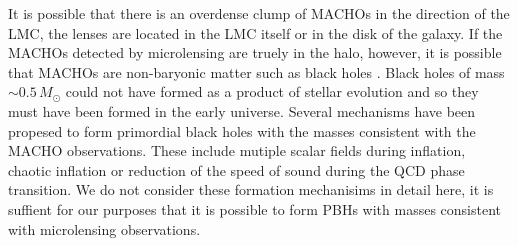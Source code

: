 It is possible that there is an overdense clump of MACHOs in the direction of
the LMC\cite{1996ApJ...473L..99N}, the lenses are located in the LMC
itself\cite{Salati:1999gd} or in the disk of the galaxy\cite{Evans:1997hq}. 
If the MACHOs detected by microlensing are truely in the halo, however, it is
possible that MACHOs are non-baryonic matter such as black holes
\cite{Finn:1996dd,Nakamura:1997sm}. Black holes of mass $\sim 0.5\,M_\odot$
could not have formed as a product of stellar evolution and so they must have
been formed in the early universe\cite{1967SvA....10..602Z,1974MNRAS.168..399C}.
Several mechanisms have been propesed to form primordial black holes with the
masses consistent with the MACHO observations. These include mutiple scalar
fields during inflation\cite{Yokoyama:1995ex}, chaotic 
inflation\cite{Yokoyama:1999xi} or reduction of the speed of sound during the
QCD phase transition\cite{Jedamzik:1996mr}. We do not consider these formation
mechanisims in detail here, it is suffient for our purposes that it is
possible to form PBHs with masses consistent with microlensing observations.

